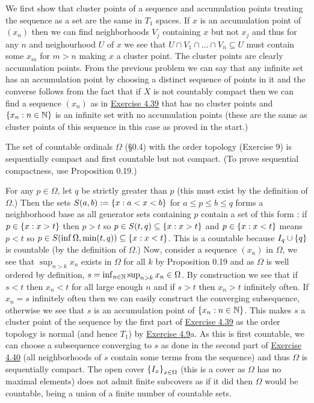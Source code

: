 \documentclass[12pt,a4paper]{article}
\begin{document}
\begin{solution}
    We first show that cluster points of a sequence and accumulation points treating the sequence as a set are the same in $T_1$ spaces. 
    If $x$ is an accumulation point of $(x_n)$ then we can find neighborhoods $V_j$ containing $x$ but not $x_j$ and thus for any $n$ and neighourhood $U$ of $x$ we see that $U\cap V_1\cap\ldots\cap V_n \subseteq U$ must contain some $x_m$ for $m>n$ making $x$ a cluster point. 
    The cluster points are clearly accumulation points. 
From the previous problem we can say that any infinite set has an accumulation point by choosing a distinct sequence of points in it and the converse follows from the fact that if $X$ is not countably compact then we can find a sequence $(x_n)$ as in \hyperref[prob:4-39]{Exercise 4.39} that has no cluster points and $ \qty{x_n:n\in\mathbb{N}}$ is an infinite set with no accumulation points (these are the same as cluster points of this sequence in this case as proved in the start.)
\end{solution}
\begin{problem}\label{prob:4-42}
The set of countable ordinals $\Omega$ (\S 0.4) with the order topology (Exercise 9) is sequentially compact and first countable but not compact. (To prove sequential compactness, use Proposition 0.19.)
\end{problem}
\begin{solution}
For any $p\in\Omega$, let $q$ be strictly greater than $p$ (this must exist by the definition of $\Omega$.) 
Then the sets $S(a,b):=\qty{x:a<x<b}$ for $a\leq p\leq b\leq q$ forms a neighborhood base as all generator sets containing $p$ contain a set of this form : if $p\in \qty{x:x>t}$ then $p>t$ so $p\in S(t,q) \subseteq \qty{x:x>t}$ and $p\in \qty{x:x<t}$ means $p<t$ so $p\in S(\inf\Omega,\min(t,q)) \subseteq \qty{x:x<t}$. 
This is a countable because $I_q\cup \qty{q}$ is countable (by the definition of $\Omega$.)  
Now, consider a sequence $(x_n)$ in $\Omega$, we see that $\sup_{n>k}x_n$ exists in $\Omega$ for all $k$ by Proposition 0.19 and as $\Omega$ is well ordered by definition, $s=\inf_{n\in\mathbb{N}}\sup_{n>k}x_n\in\Omega$. 
By construction we see that if $s<t$ then $x_n<t$ for all large enough $n$ and if $s>t$ then
$x_n>t$ infinitely often. 
If $x_n=s$ infinitely often then we can easily construct the converging subsequence, otherwise we see that $s$ is an accumulation point of $ \qty{x_n:n\in\mathbb{N}}$. 
This makes $s$ a cluster point of the sequence by the first part of \hyperref[prob:4-39]{Exercise 4.39} as the order topology is normal (and hence $T_1$) by \hyperref[prob:4-9]{Exercise 4.9}a. 
As this is first countable, we can choose a subsequence converging to $s$ as done in the second part of \hyperref[prob:4-40]{Exercise 4.40} (all neighborhoods of $s$ contain some terms from the sequence) and thus $\Omega$ is sequentially compact. 
The open cover $ \qty{I_x}_{x\in\Omega}$ (this is a cover as $\Omega$ has no maximal elements) does not admit finite subcovers as if it did then $\Omega$ would be countable, being a union of a finite number of countable sets. 
\end{solution}
\end{document}
